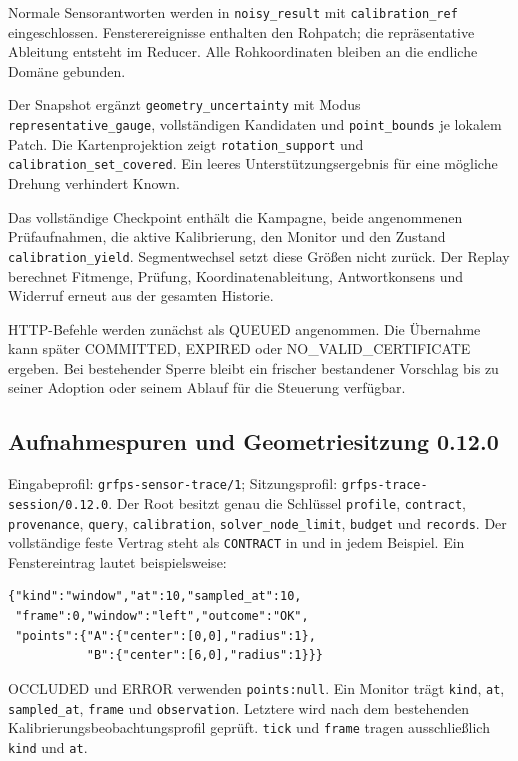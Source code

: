 \documentclass[11pt,a4paper]{article}
\begin{document}
Normale Sensorantworten werden in \texttt{noisy\_result} mit
\texttt{calibration\_ref} eingeschlossen. Fensterereignisse enthalten
den Rohpatch; die repräsentative Ableitung entsteht im Reducer.
Alle Rohkoordinaten bleiben an die endliche Domäne gebunden.

Der Snapshot ergänzt \texttt{geometry\_uncertainty} mit Modus
\texttt{representative\_gauge}, vollständigen Kandidaten und
\texttt{point\_bounds} je lokalem Patch. Die Kartenprojektion zeigt
\texttt{rotation\_support} und \texttt{calibration\_set\_covered}.
Ein leeres Unterstützungsergebnis für eine mögliche Drehung
verhindert Known.

Das vollständige Checkpoint enthält die Kampagne, beide angenommenen
Prüfaufnahmen, die aktive Kalibrierung, den Monitor und den Zustand
\texttt{calibration\_yield}. Segmentwechsel setzt diese Größen nicht
zurück. Der Replay berechnet Fitmenge, Prüfung, Koordinatenableitung,
Antwortkonsens und Widerruf erneut aus der gesamten Historie.

HTTP-Befehle werden zunächst als QUEUED angenommen. Die Übernahme
kann später COMMITTED, EXPIRED oder NO\_VALID\_CERTIFICATE ergeben.
Bei bestehender Sperre bleibt ein frischer bestandener Vorschlag
bis zu seiner Adoption oder seinem Ablauf für die Steuerung verfügbar.

\clearpage\subsection{Aufnahmespuren und Geometriesitzung 0.12.0}
Eingabeprofil: \texttt{grfps-sensor-trace/1}; Sitzungsprofil:
\texttt{grfps-trace-session/0.12.0}. Der Root besitzt genau die
Schlüssel \texttt{profile}, \texttt{contract}, \texttt{provenance},
\texttt{query}, \texttt{calibration}, \texttt{solver\_node\_limit},
\texttt{budget} und \texttt{records}. Der vollständige feste Vertrag
steht als \texttt{CONTRACT} in  und in jedem
Beispiel. Ein Fenstereintrag lautet beispielsweise:
\begin{lstlisting}
{"kind":"window","at":10,"sampled_at":10,
 "frame":0,"window":"left","outcome":"OK",
 "points":{"A":{"center":[0,0],"radius":1},
           "B":{"center":[6,0],"radius":1}}}
\end{lstlisting}
OCCLUDED und ERROR verwenden \texttt{points:null}. Ein Monitor
trägt \texttt{kind}, \texttt{at}, \texttt{sampled\_at},
\texttt{frame} und \texttt{observation}. Letztere wird nach dem
bestehenden Kalibrierungsbeobachtungsprofil geprüft. \texttt{tick}
und \texttt{frame} tragen ausschließlich \texttt{kind} und \texttt{at}.
\end{document}
